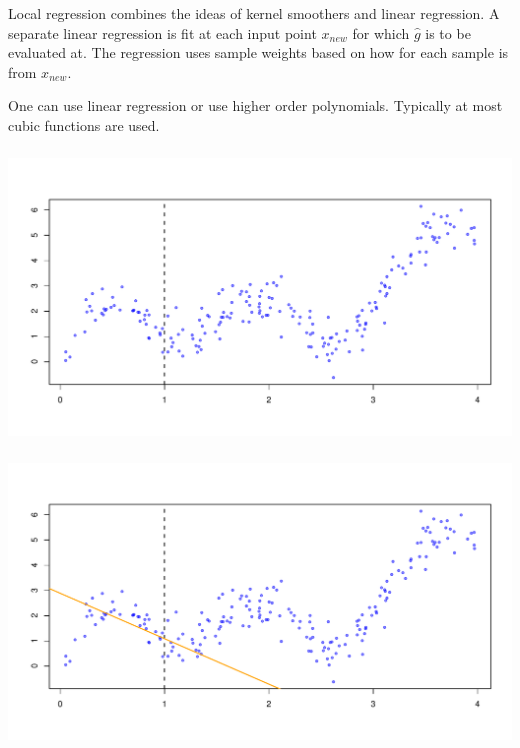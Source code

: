 \documentclass[xetex,mathserif,serif,aspectratio=169]{beamer}
\begin{document}
\begin{frame}[fragile] \frametitle{} \oldB \small


Local regression combines the ideas of kernel smoothers and linear
regression. A separate linear regression is fit at each input point
$x_{new}$ for which $\widehat{g}$ is to be evaluated at. The regression
uses sample weights based on how for each sample is from $x_{new}$.

\pause One can use linear regression or use higher order polynomials.
Typically at most cubic functions are used.

\end{frame}

\begin{frame}[fragile] \frametitle{} \oldB \small

\begin{center}
\includegraphics[width=\textwidth]{img/lowess1.pdf}
\end{center}

\end{frame}

\begin{frame}[fragile] \frametitle{} \oldB \small

\begin{center}
\includegraphics[width=\textwidth]{img/lowess2.pdf}
\end{center}

\end{frame}
\end{document}
